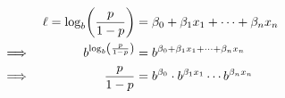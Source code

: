 \documentclass[12pt,preview,border={-2cm 0cm}]{standalone}
\DeclarePairedDelimiter{\paren}{\lparen}{\rparen}
\begin{document}
\begin{alignat*}{4}
&& \ell = \log_{b}\paren*{\frac{p}{1-p}} &= \beta_{0} + \beta_{1}x_{1} + \cdots + \beta_{n}x_{n} \\
\implies && b^{\log_{b}\paren*{\frac{p}{1-p}}} &= b^{\beta_{0} + \beta_{1}x_{1} + \cdots + \beta_{n}x_{n}} \\
\implies && \frac{p}{1-p} &= b^{\beta_{0}} \cdot b^{\beta_{1}x_{1}} \cdots  b^{\beta_{n}x_{n}} \\
\end{alignat*}
\end{document}
